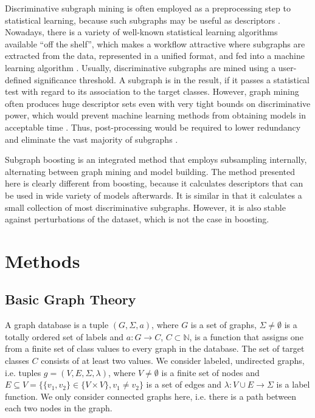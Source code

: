 \documentclass{article}
\begin{document}
Discriminative subgraph mining is often employed as a preprocessing step to
statistical learning, because such subgraphs may be useful as descriptors
\cite{bringmann10lego}. Nowadays, there is a variety of well-known statistical
learning algorithms available ``off the shelf'', which makes a workflow
attractive where subgraphs are extracted from the data, represented in a
unified format, and fed into a machine learning algorithm \cite{hkr03molfea}.
Usually, discriminative subgraphs are mined using a user-defined significance
threshold. A subgraph is in the result, if it passes a statistical test with
regard to its association to the target classes.  However, graph mining often
produces huge descriptor sets even with very tight bounds on discriminative
power, which would prevent machine learning methods from obtaining models in
acceptable time \cite{Hasan_origami:mining}.  Thus, post-processing would be
required to lower redundancy and eliminate the vast majority of subgraphs
\cite{Jun04Spin}. 

Subgraph boosting \cite{saigo09gboost} is an integrated method that employs
subsampling internally, alternating between graph mining and model building.
The method presented here is clearly different from boosting, because it
calculates descriptors that can be used in wide variety of models afterwards.
It is similar in that it calculates a small collection of most discriminative
subgraphs. However, it is also stable against perturbations of the
dataset, which is not the case in boosting.


\section{Methods}
\label{s:Methods}

\subsection{Basic Graph Theory}
\label{ss:BasicGraphTheory}
A graph database is a tuple $(G, \Sigma, a)$, where $G$ is a set of graphs,
$\Sigma \ne \emptyset$  is a totally ordered set of labels and $a: G
\rightarrow C$, $C \subset \mathbb{N}$, is a function that assigns one from a
finite set of class values to every graph in the database.  The set of target
classes $C$ consists of at least two values.  We consider labeled, undirected
graphs, i.e. tuples $g=(V,E,\Sigma,\lambda)$, where $V\ne \emptyset$ is a
finite set of nodes and $E \subseteq V = \{\{v_1, v_2\} \in \{V \times V\}, v_1
\ne v_2\}$ is a set of edges and $\lambda: V\cup E \rightarrow \Sigma$ is a
label function.  We only consider connected graphs here, i.e.  there is a path
between each two nodes in the graph.
\end{document}
